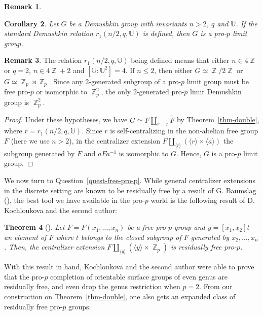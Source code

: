 \documentclass[a4paper]{amsart}
\DeclareMathOperator{\bbz}{\mathbb{Z}}
\newtheorem{thm}{Theorem}[section]
\newtheorem{cor}[thm]{Corollary}
\theoremstyle{definition}
\newtheorem{rmk}[thm]{Remark}
\begin{document}
\begin{rmk}
\end{rmk}

\begin{cor}\label{corollary-embed-ce} Let \(G\) be a Demushkin group with invariants \(n>2\), \(q\) and \(\mathbb{U}\). If the standard Demushkin relation \(r_1(n/2,q,\mathbb{U})\) is defined, then \(G\) is a pro-\(p\) limit group.
\end{cor}
\begin{rmk} The relation \(r_1(n/2,q,\mathbb{U})\) being defined means that either \(n \in 4\bbz\) or \(q = 2\), \(n \in 4\bbz + 2\) and \([\mathbb{U}\colon \mathbb{U}^2] = 4\). If \(n \leq 2\), then either \(G \simeq \bbz/2\bbz\) or \(G \simeq \bbz_p \rtimes \bbz_p\). Since any \(2\)-generated subgroup of a pro-\(p\) limit group must be free pro-\(p\) or isomorphic to \(\bbz_p^2\), the only \(2\)-generated pro-\(p\) limit Demushkin group is \(\bbz_p^2\).
\end{rmk}
\begin{proof} Under these hypotheses, we have \(G \simeq F \amalg_{r = \widetilde{r}} \widetilde{F}\) by Theorem~\ref{thm-double}, where \(r = r_1(n/2,q,\mathbb{U})\). Since \(r\) is self-centralizing in the non-abelian free group \(F\) (here we use \(n > 2\)), in the centralizer extension \(F \amalg_{\langle r\rangle} (\langle r\rangle \times \langle a\rangle)\) the subgroup generated by \(F\) and \(aFa^{-1}\) is isomorphic to \(G\). Hence, \(G\) is a pro-\(p\) limit group.
\end{proof}

We now turn to Question~\ref{quest-free-pro-p}. While general centralizer extensions in the discrete setting are known to be residually free by a result of G. Baumslag (\cite{baumslagGeneralisedFreeProducts1962}), the best tool we have available in the pro-\(p\) world is the following result of D. Kochloukova and the second author:

\begin{thm}[{\cite[Thm. 4.1]{kochloukovaFullyResiduallyFree2010}}]\label{thm-desi-zalesskii} Let \(F = F(x_1,\ldots,x_n)\) be a free pro-\(p\) group and \(y = [x_1,x_2]t\) an element of \(F\) where  \(t\) belongs to the closed subgroup of \(F\) generated by \(x_2,\ldots,x_n\). Then, the centralizer extension \(F \amalg_{\langle y\rangle} (\langle y \rangle \times \bbz_p)\) is residually free pro-\(p\).
\end{thm}

With this result in hand, Kochloukova and the second author were able to prove that the pro-\(p\) completion of orientable surface groups of even genus are residually free, and even drop the genus restriction when \(p = 2\). From our construction on Theorem~\ref{thm-double}, one also gets an expanded class of residually free pro-\(p\) groups:
\end{document}
